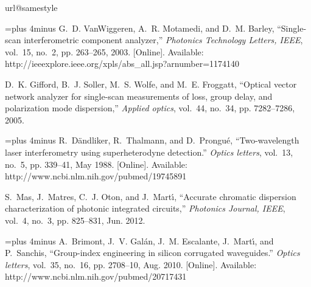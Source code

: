 \documentclass[journal]{IEEEtran}
\begin{document}
% 
% 

\begin{thebibliography}{10}
\providecommand{\url}[1]{#1}
\csname url@samestyle\endcsname
\providecommand{\newblock}{\relax}
\providecommand{\bibinfo}[2]{#2}
\providecommand{\BIBentrySTDinterwordspacing}{\spaceskip=0pt\relax}
\providecommand{\BIBentryALTinterwordstretchfactor}{4}
\providecommand{\BIBentryALTinterwordspacing}{\spaceskip=\fontdimen2\font plus
\BIBentryALTinterwordstretchfactor\fontdimen3\font minus
  \fontdimen4\font\relax}
\providecommand{\BIBforeignlanguage}[2]{{%
\expandafter\ifx\csname l@#1\endcsname\relax
\typeout{** WARNING: IEEEtran.bst: No hyphenation pattern has been}%
\typeout{** loaded for the language `#1'. Using the pattern for}%
\typeout{** the default language instead.}%
\else
\language=\csname l@#1\endcsname
\fi
#2}}
\providecommand{\BIBdecl}{\relax}
\BIBdecl

\BIBentryALTinterwordspacing
G.~D. VanWiggeren, A.~R. Motamedi, and D.~M. Barley, ``{Single-scan
  interferometric component analyzer},'' \emph{Photonics Technology Letters,
  IEEE}, vol.~15, no.~2, pp. 263--265, 2003. [Online]. Available:
  \url{http://ieeexplore.ieee.org/xpls/abs\_all.jsp?arnumber=1174140}
\BIBentrySTDinterwordspacing

D.~K. Gifford, B.~J. Soller, M.~S. Wolfe, and M.~E. Froggatt, ``{Optical vector
  network analyzer for single-scan measurements of loss, group delay, and
  polarization mode dispersion},'' \emph{Applied optics}, vol.~44, no.~34, pp.
  7282--7286, 2005.

\BIBentryALTinterwordspacing
R.~D\"{a}ndliker, R.~Thalmann, and D.~Prongu\'{e}, ``{Two-wavelength laser
  interferometry using superheterodyne detection.}'' \emph{Optics letters},
  vol.~13, no.~5, pp. 339--41, May 1988. [Online]. Available:
  \url{http://www.ncbi.nlm.nih.gov/pubmed/19745891}
\BIBentrySTDinterwordspacing

S.~Mas, J.~Matres, C.~J. Oton, and J.~Mart\'{\i}, ``{Accurate chromatic
  dispersion characterization of photonic integrated circuits},''
  \emph{Photonics Journal, IEEE}, vol.~4, no.~3, pp. 825--831, Jun. 2012.

\BIBentryALTinterwordspacing
A.~Brimont, J.~V. Gal\'{a}n, J.~M. Escalante, J.~Mart\'{\i}, and P.~Sanchis,
  ``{Group-index engineering in silicon corrugated waveguides.}'' \emph{Optics
  letters}, vol.~35, no.~16, pp. 2708--10, Aug. 2010. [Online]. Available:
  \url{http://www.ncbi.nlm.nih.gov/pubmed/20717431}
\BIBentrySTDinterwordspacing


\end{thebibliography}
\end{document}
